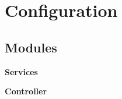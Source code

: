 \section{Configuration}
\label{group__configuration}
\subsection*{Modules}
\begin{CompactItemize}
\item 
\bf{Services}
\item 
\bf{Controller}
\end{CompactItemize}
